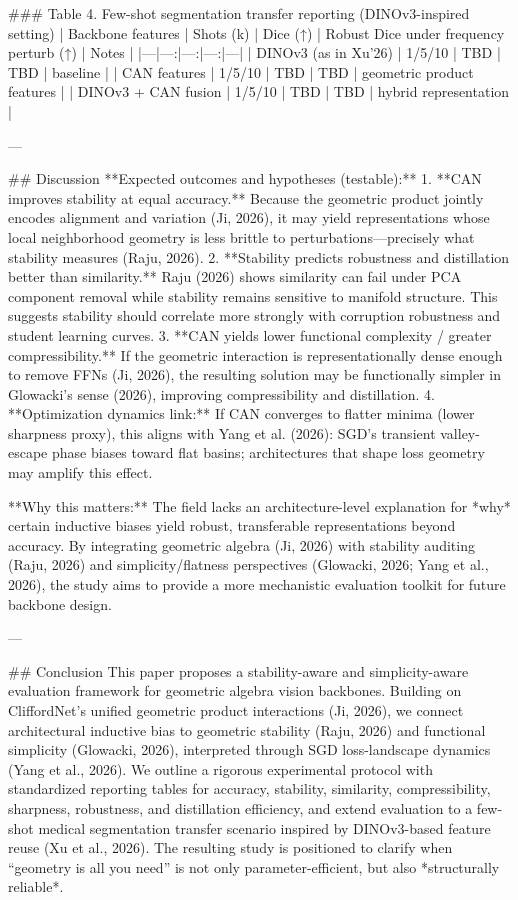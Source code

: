 ### Table 4. Few-shot segmentation transfer reporting (DINOv3-inspired setting)  
| Backbone features | Shots (k) | Dice (↑) | Robust Dice under frequency perturb (↑) | Notes |
|---|---:|---:|---:|---|
| DINOv3 (as in Xu’26) | 1/5/10 | TBD | TBD | baseline |
| CAN features | 1/5/10 | TBD | TBD | geometric product features |
| DINOv3 + CAN fusion | 1/5/10 | TBD | TBD | hybrid representation |

---

## Discussion  
**Expected outcomes and hypotheses (testable):**  
1. **CAN improves stability at equal accuracy.** Because the geometric product jointly encodes alignment and variation (Ji, 2026), it may yield representations whose local neighborhood geometry is less brittle to perturbations—precisely what stability measures (Raju, 2026).  
2. **Stability predicts robustness and distillation better than similarity.** Raju (2026) shows similarity can fail under PCA component removal while stability remains sensitive to manifold structure. This suggests stability should correlate more strongly with corruption robustness and student learning curves.  
3. **CAN yields lower functional complexity / greater compressibility.** If the geometric interaction is representationally dense enough to remove FFNs (Ji, 2026), the resulting solution may be functionally simpler in Glowacki’s sense (2026), improving compressibility and distillation.  
4. **Optimization dynamics link:** If CAN converges to flatter minima (lower sharpness proxy), this aligns with Yang et al. (2026): SGD’s transient valley-escape phase biases toward flat basins; architectures that shape loss geometry may amplify this effect.

**Why this matters:** The field lacks an architecture-level explanation for *why* certain inductive biases yield robust, transferable representations beyond accuracy. By integrating geometric algebra (Ji, 2026) with stability auditing (Raju, 2026) and simplicity/flatness perspectives (Glowacki, 2026; Yang et al., 2026), the study aims to provide a more mechanistic evaluation toolkit for future backbone design.

---

## Conclusion  
This paper proposes a stability-aware and simplicity-aware evaluation framework for geometric algebra vision backbones. Building on CliffordNet’s unified geometric product interactions (Ji, 2026), we connect architectural inductive bias to geometric stability (Raju, 2026) and functional simplicity (Glowacki, 2026), interpreted through SGD loss-landscape dynamics (Yang et al., 2026). We outline a rigorous experimental protocol with standardized reporting tables for accuracy, stability, similarity, compressibility, sharpness, robustness, and distillation efficiency, and extend evaluation to a few-shot medical segmentation transfer scenario inspired by DINOv3-based feature reuse (Xu et al., 2026). The resulting study is positioned to clarify when “geometry is all you need” is not only parameter-efficient, but also *structurally reliable*.


